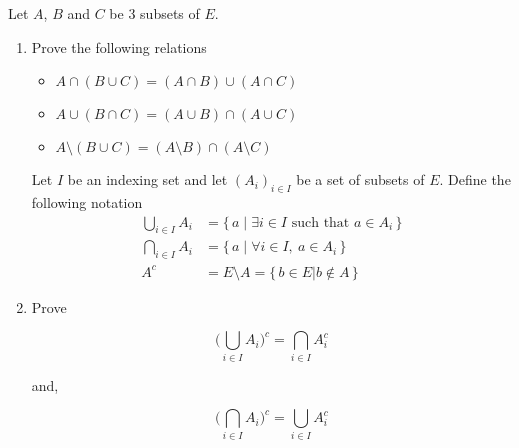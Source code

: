\documentclass{pset}
\begin{document}
\maketitle

\pagebreak

\begin{problem}
    Let $A$, $B$ and $C$ be 3 subsets of $E$. 
    \begin{enumerate}
        \item Prove the following relations
        \begin{itemize}
            \item $A\cap (B\cup C) = (A\cap B)\cup(A\cap C)$
            \item $A\cup (B\cap C) = (A\cup B)\cap(A\cup C)$
            \item $A\setminus (B\cup C) = (A\setminus B) \cap (A\setminus C)$
        \end{itemize}
        \begin{definition}
            Let $I$ be an indexing set and let $(A_i)_{i\in I}$ be a set of subsets of $E$. Define the following notation
            \begin{align*}
                \bigcup_{i\in I} A_i &= \{\, a \mid \exists i\in I \text{ such that } a\in A_i \,\}\\
                \bigcap_{i\in I} A_i &= \{\, a \mid \forall i\in I,\ a\in A_i \,\} \\
                A^c &= E\setminus A = \{\, b\in E| b\not\in A\,\}
            \end{align*}
        \end{definition}
        \item Prove
    
        \begin{minipage}{0.45\linewidth}
        \[
            \bigg(\bigcup_{i\in I} A_i\bigg)^c = \bigcap_{i\in I} A_i^c
        \]
        \end{minipage}
        \hfill
        and,
        \hfill
        \begin{minipage}{0.45\linewidth}
        \[
            \bigg(\bigcap_{i\in I} A_i\bigg)^c = \bigcup_{i\in I} A_i^c
        \]
        \end{minipage}
    \end{enumerate}

\end{problem}
\end{document}

